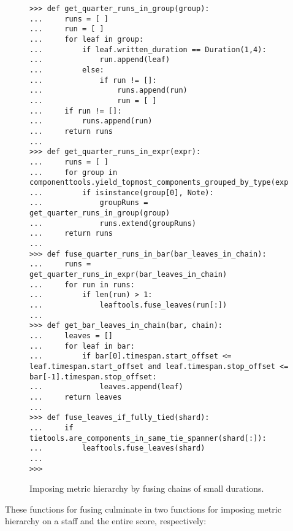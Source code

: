 \begin{figure}[H]
\begin{lstlisting}[basicstyle=\scriptsize\ttfamily, breaklines=True, tabsize=4, showtabs=false, showspaces=false]
>>> def get_quarter_runs_in_group(group):
...     runs = [ ]
...     run = [ ]
...     for leaf in group:
...         if leaf.written_duration == Duration(1,4):
...             run.append(leaf)
...         else:
...             if run != []:
...                 runs.append(run)
...                 run = [ ]
...     if run != []:
...         runs.append(run)
...     return runs
... 
>>> def get_quarter_runs_in_expr(expr):
...     runs = [ ]
...     for group in componenttools.yield_topmost_components_grouped_by_type(expr):
...         if isinstance(group[0], Note):
...             groupRuns = get_quarter_runs_in_group(group)
...             runs.extend(groupRuns)
...     return runs
... 
>>> def fuse_quarter_runs_in_bar(bar_leaves_in_chain):
...     runs = get_quarter_runs_in_expr(bar_leaves_in_chain)
...     for run in runs:
...         if len(run) > 1:
...             leaftools.fuse_leaves(run[:])
... 
>>> def get_bar_leaves_in_chain(bar, chain):
...     leaves = []
...     for leaf in bar:
...         if bar[0].timespan.start_offset <= leaf.timespan.start_offset and leaf.timespan.stop_offset <= bar[-1].timespan.stop_offset:
...             leaves.append(leaf)
...     return leaves
... 
>>> def fuse_leaves_if_fully_tied(shard):
...     if tietools.are_components_in_same_tie_spanner(shard[:]):
...         leaftools.fuse_leaves(shard)
... 
>>> \end{lstlisting}

\caption{Imposing metric hierarchy by fusing chains of small durations. } 
\end{figure}

These functions for fusing culminate in two functions for imposing metric hierarchy on a staff and the entire score, respectively: 

